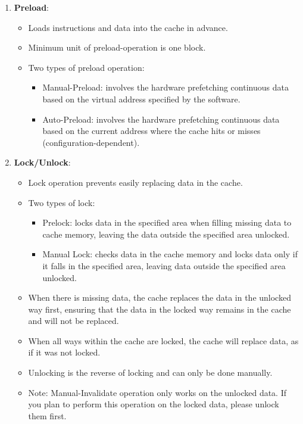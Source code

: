 \documentclass[main\_\_EN.tex]{subfiles}
\begin{document}
\begin{enumerate}
    \item \textbf{Preload}:
    \begin{itemize}
        \item Loads instructions and data into the cache in advance.
        \item Minimum unit of preload-operation is one block.
        \item Two types of preload operation:
        \begin{itemize}
            \item Manual-Preload: involves the hardware prefetching continuous data based on the virtual address specified by the software.
            \item Auto-Preload: involves the hardware prefetching continuous data based on the current address where the cache hits or misses (configuration-dependent).
        \end{itemize}
    \end{itemize}

    \item \textbf{Lock/Unlock}:
    \begin{itemize}
        \item Lock operation prevents easily replacing data in the cache.
        \item Two types of lock:
        \begin{itemize}
            \item Prelock: locks data in the specified area when filling missing data to cache memory, leaving the data outside the specified area unlocked.
            \item Manual Lock: checks data in the cache memory and locks data only if it falls in the specified area, leaving data outside the specified area unlocked.
        \end{itemize}
        \item When there is missing data, the cache replaces the data in the unlocked way first, ensuring that the data in the locked way remains in the cache and will not be replaced.
        \item When all ways within the cache are locked, the cache will replace data, as if it was not locked.
        \item Unlocking is the reverse of locking and can only be done manually.
        \item Note: Manual-Invalidate operation only works on the unlocked data. If you plan to perform this operation on the locked data, please unlock them first.
    \end{itemize}
\end{enumerate}
\end{document}
